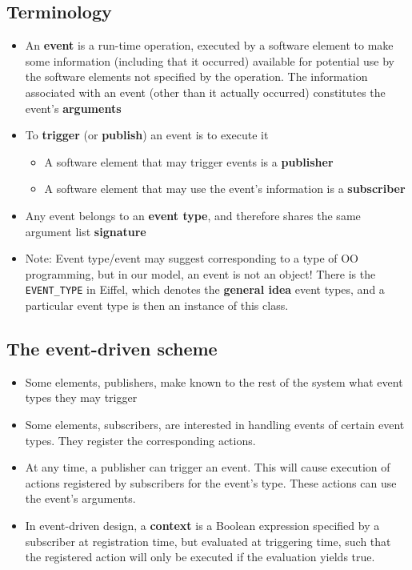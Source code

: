 \documentclass[a4paper]{article}
\newcommand{\inline}[1]{\lstinline!#1!}%
\begin{document}
\subsection{Terminology}
\begin{itemize}
\item An \textbf{event} is a run-time operation, executed by a software element to make some information (including that it occurred) available for potential use by the software elements not specified by the operation. The information associated with an event (other than it actually occurred) constitutes the event's \textbf{arguments}
\item To \textbf{trigger} (or \textbf{publish}) an event is to execute it
\begin{itemize}
\item A software element that may trigger events is a \textbf{publisher}
\item A software element that may use the event's information is a \textbf{subscriber}
\end{itemize}
\item Any event belongs to an \textbf{event type}, and therefore shares the same argument list \textbf{signature}
\item Note: Event type/event may suggest corresponding to a type of OO programming, but in our model, an event is not an object! There is the \inline{EVENT_TYPE} in Eiffel, which denotes the \textbf{general idea} event types, and a particular event type is then an instance of this class.
\end{itemize}
\subsection{The event-driven scheme}
\begin{itemize}
\item Some elements, publishers, make known to the rest of the system what event types they may trigger
\item Some elements, subscribers, are interested in handling events of certain event types. They register the corresponding actions.
\item At any time, a publisher can trigger an event. This will cause execution of actions registered by subscribers for the event's type. These actions can use the event's arguments. 
\item In event-driven design, a \textbf{context} is a Boolean expression specified by  a subscriber at registration time, but evaluated at triggering time, such that the registered action will only be executed if the evaluation yields true. 
\end{itemize}
\end{document}
